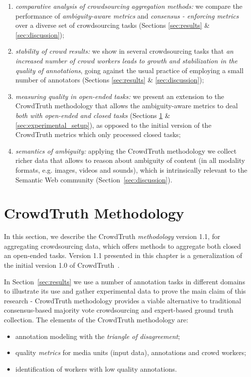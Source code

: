 \begin{enumerate}

\item \textit{comparative analysis of crowdsourcing aggregation methods:} we compare the performance of \textit{ambiguity-aware metrics} and \textit{consensus - enforcing metrics} over a diverse set of crowdsourcing tasks (Sections \ref{sec:results} \& \ref{sec:discussion});

\item \textit{stability of crowd results:} we show in several crowdsourcing tasks that \textit{an increased number of crowd workers leads to growth and stabilization in the quality of annotations}, going against the usual practice of employing a small number of annotators (Sections \ref{sec:results} \& \ref{sec:discussion});

\item \textit{measuring quality in open-ended tasks:} we present an extension to the CrowdTruth methodology that allows the ambiguity-aware metrics to deal \textit{both with open-ended and closed tasks} (Sections \ref{sec:methodology} \& \ref{sec:experimental_setup}), as opposed to the initial version of the CrowdTruth metrics which only processed closed tasks;

\item \textit{semantics of ambiguity:} applying the CrowdTruth methodology we collect richer data that allows to reason about ambiguity of content (in all modality formats, e.g. images, videos and sounds), which is intrinsically relevant to the Semantic Web community (Section~\ref{sec:discussion}).

\end{enumerate}


\section{CrowdTruth Methodology}
\label{sec:methodology}

In this section, we describe the CrowdTruth \textit{methodology} version 1.1, for aggregating crowdsourcing data, which offers methods to aggregate both closed an open-ended tasks. Version 1.1 presented in this chapter is a generalization of the initial version 1.0 of CrowdTruth~\cite{inel2014crowdtruth}.

In Section~\ref{sec:results} we use a number of annotation tasks in different domains  to illustrate its use and gather experimental data to prove the main claim of this research - CrowdTruth methodology provides a viable alternative to traditional consensus-based majority vote crowdsourcing and expert-based ground truth collection. The elements of the CrowdTruth methodology are:
\begin{itemize}
\item annotation modeling with the \emph{triangle of disagreement};
\item quality \emph{metrics} for media units (input data), annotations and crowd workers;
\item identification of workers with low quality annotations.
\end{itemize}

